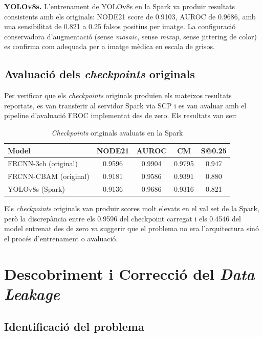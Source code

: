 \textbf{YOLOv8s.} L'entrenament de YOLOv8s en la Spark va produir resultats consistents amb els originals: NODE21 score de 0.9103, AUROC de 0.9686, amb una sensibilitat de 0.821 a 0.25 falsos positius per imatge. La configuració conservadora d'augmentació (sense \textit{mosaic}, sense \textit{mixup}, sense jittering de color) es confirma com adequada per a imatge mèdica en escala de grisos.

\subsection{Avaluació dels \textit{checkpoints} originals}

Per verificar que els \textit{checkpoints} originals produïen els mateixos resultats reportats, es van transferir al servidor Spark via SCP i es van avaluar amb el pipeline d'avaluació FROC implementat des de zero. Els resultats van ser:

\begin{table}[H]
\centering
\caption{\textit{Checkpoints} originals avaluats en la Spark}
\label{tab:originals}
\begin{tabular}{lcccc}
\toprule
\textbf{Model} & \textbf{NODE21} & \textbf{AUROC} & \textbf{CM} & \textbf{S@0.25} \\
\midrule
FRCNN-3ch (original) & 0.9596 & 0.9904 & 0.9795 & 0.947 \\
FRCNN-CBAM (original) & 0.9181 & 0.9586 & 0.9391 & 0.880 \\
YOLOv8s (Spark) & 0.9136 & 0.9686 & 0.9316 & 0.821 \\
\bottomrule
\end{tabular}
\end{table}

Els \textit{checkpoints} originals van produir scores molt elevats en el val set de la Spark, però la discrepància entre els 0.9596 del checkpoint carregat i els 0.4546 del model entrenat des de zero va suggerir que el problema no era l'arquitectura sinó el procés d'entrenament o avaluació.

\section{Descobriment i Correcció del \textit{Data Leakage}}

\subsection{Identificació del problema}

